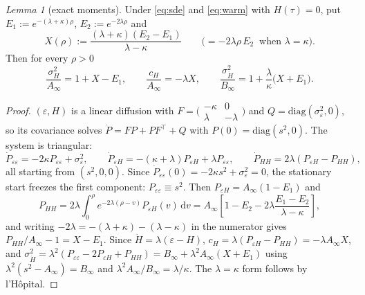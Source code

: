\documentclass[11pt,a4paper]{article}
\theoremstyle{remark}\newtheorem{remark}[proposition]{Remark}
\newtheorem{lemma}{Lemma}[section]
\newcommand{\dd}{\mathrm{d}}
\newcommand{\Ain}{A_{\infty}}
\newcommand{\Bin}{B_{\infty}}
\begin{document}
\begin{lemma}[exact moments]\label{lem:moments}
Under \eqref{eq:sde} and \eqref{eq:warm} with $H(\tau)=0$, put
$E_1:=e^{-(\lambda+\kappa)\rho}$, $E_2:=e^{-2\lambda\rho}$ and
\begin{equation}
X(\rho):=\frac{(\lambda+\kappa)(E_2-E_1)}{\lambda-\kappa}
\qquad\bigl(=-2\lambda\rho\,E_2\ \text{ when }\lambda=\kappa\bigr).
\label{eq:Xdef}
\end{equation}
Then for every $\rho>0$
\begin{equation}
\frac{\sigma_H^{2}}{\Ain}=1+X-E_1,\qquad
\frac{c_H}{\Ain}=-\lambda X,\qquad
\frac{\sigma_{\dot H}^{2}}{\Bin}=1+\frac{\lambda}{\kappa}\bigl(X+E_1\bigr).
\label{eq:moments}
\end{equation}
\end{lemma}
\begin{proof}
$(\varepsilon,H)$ is a linear diffusion with
$F=\bigl(\begin{smallmatrix}-\kappa&0\\ \lambda&-\lambda\end{smallmatrix}\bigr)$ and
$Q=\mathrm{diag}(\sigma_\varepsilon^{2},0)$, so its covariance solves
$\dot P=FP+PF^{\!\top}+Q$ with $P(0)=\mathrm{diag}(s^{2},0)$. The system is triangular:
\[
\dot P_{\varepsilon\varepsilon}=-2\kappa P_{\varepsilon\varepsilon}+\sigma_\varepsilon^{2},
\qquad
\dot P_{\varepsilon H}=-(\kappa+\lambda)P_{\varepsilon H}+\lambda P_{\varepsilon\varepsilon},
\qquad
\dot P_{HH}=2\lambda(P_{\varepsilon H}-P_{HH}),
\]
all starting from $(s^{2},0,0)$. Since
$\dot P_{\varepsilon\varepsilon}(0)=-2\kappa s^{2}+\sigma_\varepsilon^{2}=0$, the
stationary start freezes the first component: $P_{\varepsilon\varepsilon}\equiv s^{2}$.
Then $P_{\varepsilon H}=\Ain(1-E_1)$ and
\[
P_{HH}=2\lambda\!\int_0^{\rho}\!e^{-2\lambda(\rho-v)}P_{\varepsilon H}(v)\,\dd v
=\Ain\left[1-E_2-2\lambda\frac{E_1-E_2}{\lambda-\kappa}\right],
\]
and writing $-2\lambda=-(\lambda+\kappa)-(\lambda-\kappa)$ in the numerator gives
$P_{HH}/\Ain-1=X-E_1$. Since $\dot H=\lambda(\varepsilon-H)$,
$c_H=\lambda(P_{\varepsilon H}-P_{HH})=-\lambda\Ain X$, and
$\sigma_{\dot H}^{2}=\lambda^{2}(P_{\varepsilon\varepsilon}-2P_{\varepsilon H}+P_{HH})
=\Bin+\lambda^{2}\Ain(X+E_1)$ using $\lambda^{2}(s^{2}-\Ain)=\Bin$ and
$\lambda^{2}\Ain/\Bin=\lambda/\kappa$. The $\lambda=\kappa$ form follows by
l'H\^opital.
\end{proof}
\end{document}
